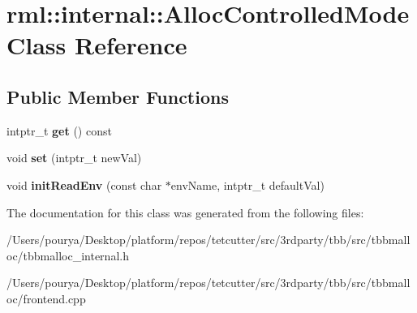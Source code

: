 \hypertarget{classrml_1_1internal_1_1AllocControlledMode}{}\section{rml\+:\+:internal\+:\+:Alloc\+Controlled\+Mode Class Reference}
\label{classrml_1_1internal_1_1AllocControlledMode}
\subsection*{Public Member Functions}
\begin{DoxyCompactItemize}
\item 
\hypertarget{classrml_1_1internal_1_1AllocControlledMode_a931e08ba45508ed52801df55a45ef523}{}intptr\+\_\+t {\bfseries get} () const \label{classrml_1_1internal_1_1AllocControlledMode_a931e08ba45508ed52801df55a45ef523}

\item 
\hypertarget{classrml_1_1internal_1_1AllocControlledMode_a667994734f9857f4faa0f2a7fe4a6bb7}{}void {\bfseries set} (intptr\+\_\+t new\+Val)\label{classrml_1_1internal_1_1AllocControlledMode_a667994734f9857f4faa0f2a7fe4a6bb7}

\item 
\hypertarget{classrml_1_1internal_1_1AllocControlledMode_a9b4c1957bc9c6bdeb412cbb92514ebdb}{}void {\bfseries init\+Read\+Env} (const char $\ast$env\+Name, intptr\+\_\+t default\+Val)\label{classrml_1_1internal_1_1AllocControlledMode_a9b4c1957bc9c6bdeb412cbb92514ebdb}

\end{DoxyCompactItemize}


The documentation for this class was generated from the following files\+:\begin{DoxyCompactItemize}
\item 
/\+Users/pourya/\+Desktop/platform/repos/tetcutter/src/3rdparty/tbb/src/tbbmalloc/tbbmalloc\+\_\+internal.\+h\item 
/\+Users/pourya/\+Desktop/platform/repos/tetcutter/src/3rdparty/tbb/src/tbbmalloc/frontend.\+cpp\end{DoxyCompactItemize}
